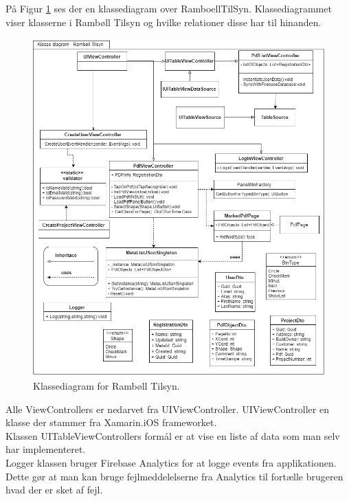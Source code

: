 På Figur \ref{fig:KlasseDiagram} ses der en klassediagram over RamboellTilSyn. Klassediagrammet viser klasserne i Rambøll Tilsyn og hvilke relationer disse har til hinanden.
\begin{figure}[H] %
	\centering
	\includegraphics[height=13cm, width=17cm]{Arkitektur/KlasseDiagram}
	\caption{Klassediagram for Rambøll Tilsyn.}
	\label{fig:KlasseDiagram}
\end{figure}


Alle ViewControllers er nedarvet fra UIViewController\cite{UIViewController}. UIViewController en klasse der stammer fra Xamarin.iOS frameworket. \\
Klassen UITableViewControllers formål er at vise en liste af data som man selv har implementeret. \\
Logger klassen bruger Firebase Analytics\cite{FirebaseAnalytic} for at logge events fra applikationen. Dette gør at man kan bruge fejlmeddelelserne fra Analytics til fortælle brugeren hvad der er sket af fejl.  
